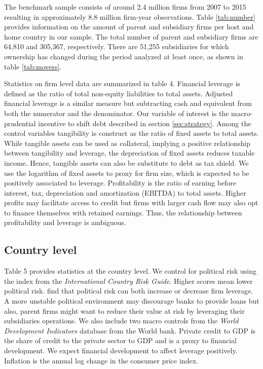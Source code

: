 \documentclass[12pt]{article}
\begin{document}
	The benchmark sample consists of around 2.4 million firms from 2007 to 2015 resulting in approximately 8.8 million firm-year observations. Table \ref{tab:number} provides information on the amount of parent and subsidiary firms per host and home country in our sample. The total number of parent and subsidiary firms are 64,810 and 305,367, respectively. There are 51,255 subsidiaries for which ownership has changed during the period analyzed at least once, as shown in table \ref{tab:movers}.
	
	Statistics on firm level data are summarized in table 4. Financial leverage is defined as the ratio of total non-equity liabilities to total assets. Adjusted financial leverage is a similar measure but subtracting cash and equivalent from both the numerator and the denominator. Our variable of interest is the macro-prudential incentive to shift debt described in section \ref{sec:strategy}. Among the control variables tangibility is construct as the ratio of fixed assets to total assets. While tangible assets can be used as collateral, implying a positive relationship between tangibility and leverage, the depreciation of fixed assets reduces taxable income. Hence, tangible assets can also be substitute to debt as tax shield. We use the logarithm of fixed assets to proxy for firm size, which is expected to be positively associated to leverage. Profitability is the ratio of earning before interest, tax, depreciation and amortization (EBITDA) to total assets. Higher profits may facilitate access to credit but firms with larger cash flow may also opt to finance themselves with retained earnings. Thus, the relationship between profitability and leverage is ambiguous. 
	\subsection{Country level} \label{subsec:country}
	Table 5 provides statistics at the country level. We control for political risk using the index from the \textit{International Country Risk Guide}. Higher scores mean lower political risk. \cite*{kesternich2010afraid} find that political risk can both increase or decrease firm leverage. A more unstable political environment may discourage banks to provide loans but also, parent firms might want to reduce their value at risk by leveraging their subsidiaries operations. We also include two macro controls from the \textit{World Development Indicators} database from the World bank. Private credit to GDP is the share of credit to the private sector to GDP and is a proxy to financial development. We expect financial development to affect leverage positively. Inflation is the annual log change in the consumer price index.   
	
\end{document}
